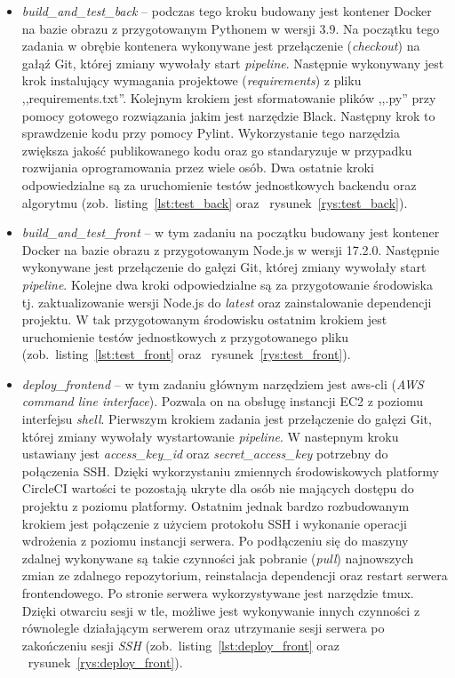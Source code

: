 \newpage
\begin{itemize}
	\item \textit{build\_and\_test\_back} -- podczas tego kroku budowany jest kontener Docker na bazie obrazu z przygotowanym Pythonem w wersji 3.9. Na początku tego zadania w obrębie kontenera wykonywane jest przełączenie (\textit{checkout}) na gałąź Git, której zmiany wywołały start \textit{pipeline}. Następnie wykonywany jest krok instalujący wymagania projektowe (\textit{requirements}) z pliku ,,requirements.txt''. Kolejnym krokiem jest sformatowanie plików ,,.py'' przy pomocy gotowego rozwiązania jakim jest narzędzie Black. Następny krok to sprawdzenie kodu przy pomocy Pylint. Wykorzystanie tego narzędzia zwiększa jakość publikowanego kodu oraz go standaryzuje w przypadku rozwijania oprogramowania przez wiele osób. Dwa ostatnie kroki odpowiedzialne są za uruchomienie testów jednostkowych backendu oraz algorytmu (zob.~listing~\ref{lst:test_back} oraz ~rysunek~\ref{rys:test_back}).
	\item \textit{build\_and\_test\_front} -- w tym zadaniu na początku budowany jest kontener Docker na bazie obrazu z przygotowanym Node.js w wersji 17.2.0. Następnie wykonywane jest przełączenie do gałęzi Git, której zmiany wywołały start \textit{pipeline}.  Kolejne dwa kroki odpowiedzialne są za przygotowanie środowiska tj. zaktualizowanie wersji Node.js do \textit{latest} oraz zainstalowanie dependencji projektu. W tak przygotowanym środowisku ostatnim krokiem jest uruchomienie testów jednostkowych z przygotowanego pliku (zob.~listing~\ref{lst:test_front} oraz ~rysunek~\ref{rys:test_front}).
	\item \textit{deploy\_frontend} -- w tym zadaniu głównym narzędziem jest aws-cli (\textit{AWS command line interface}). Pozwala on na obsługę instancji EC2 z poziomu interfejsu \textit{shell}. Pierwszym krokiem zadania jest przełączenie do gałęzi Git, której zmiany wywołały wystartowanie \textit{pipeline}. W nastepnym kroku ustawiany jest \textit{access\_key\_id} oraz \textit{secret\_access\_key} potrzebny do połączenia SSH. Dzięki wykorzystaniu zmiennych środowiskowych platformy CircleCI wartości te pozostają ukryte dla osób nie mających dostępu do projektu z poziomu platformy. Ostatnim jednak bardzo rozbudowanym krokiem jest połączenie z użyciem protokołu SSH i wykonanie operacji wdrożenia z poziomu instancji serwera. Po podłączeniu się do maszyny zdalnej wykonywane są takie czynności jak pobranie (\textit{pull}) najnowszych zmian ze zdalnego repozytorium, reinstalacja dependencji oraz restart serwera frontendowego. Po stronie serwera wykorzystywane jest narzędzie tmux. Dzięki otwarciu sesji w tle, możliwe jest wykonywanie innych czynności z równolegle działającym serwerem oraz utrzymanie sesji serwera po zakończeniu sesji \textit{SSH} (zob.~listing~\ref{lst:deploy_front} oraz ~rysunek~\ref{rys:deploy_front}).

\end{itemize}

